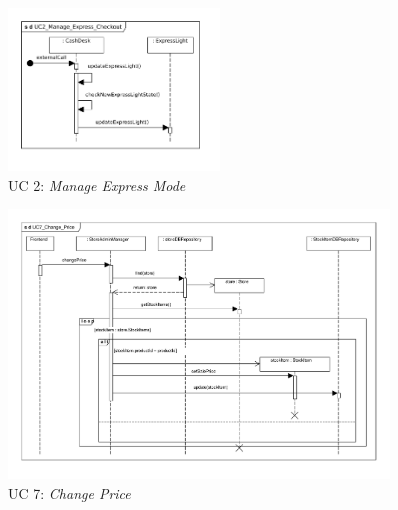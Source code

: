 			\begin{figure}[!h]
				\centering
				\includegraphics[width = 0.5\textwidth]{img/UC2_Manage_Express_Checkout.pdf}
				\caption{UC 2: \textit{Manage Express Mode}}
				\label{MS_UC2}
			\end{figure}
			
			\begin{figure}[!h]
				\centering
				\includegraphics[width = 0.9\textwidth]{img/UC7_Change_Price.pdf}
				\caption{UC 7: \textit{Change Price}}
				\label{MS_UC7}
			\end{figure}
			
